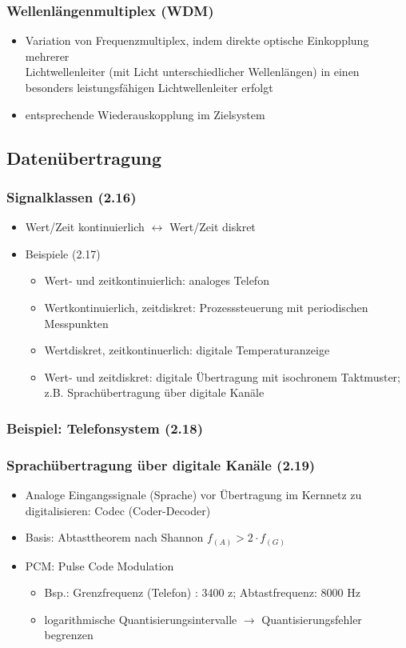 \subsubsection{Wellenlängenmultiplex (WDM)}
\begin{itemize}
	\item Variation von Frequenzmultiplex, indem direkte optische Einkopplung mehrerer \\Lichtwellenleiter (mit Licht unterschiedlicher Wellenlängen) in einen besonders leistungsfähigen Lichtwellenleiter erfolgt
	\item entsprechende Wiederauskopplung im Zielsystem
\end{itemize}
\subsection{Datenübertragung}
\subsubsection{Signalklassen (2.16)}
\begin{itemize}
	\item Wert/Zeit kontinuierlich \(\leftrightarrow \) Wert/Zeit diskret
	\item Beispiele (2.17)
	\begin{itemize}
		\item Wert- und zeitkontinuierlich: analoges Telefon
		\item Wertkontinuierlich, zeitdiskret: Prozesssteuerung mit periodischen Messpunkten
		\item Wertdiskret, zeitkontinuerlich: digitale Temperaturanzeige
		\item Wert- und zeitdiskret: digitale Übertragung mit isochronem Taktmuster; z.B. Sprachübertragung über digitale Kanäle
	\end{itemize}
\end{itemize}
\subsubsection{Beispiel: Telefonsystem (2.18)}
\subsubsection{Sprachübertragung über digitale Kanäle (2.19)}
\begin{itemize}
	\item Analoge Eingangssignale (Sprache) vor Übertragung im Kernnetz zu digitalisieren: Codec (Coder-Decoder)
	\item Basis: Abtasttheorem nach Shannon \( f_(A) > 2\cdot f_(G) \)
	\item PCM: Pulse Code Modulation
	\begin{itemize}
		\item Bsp.: Grenzfrequenz (Telefon) : 3400 z; Abtastfrequenz: 8000 Hz
		\item logarithmische Quantisierungsintervalle \(\to\) Quantisierungsfehler begrenzen
	\end{itemize}
\end{itemize}
